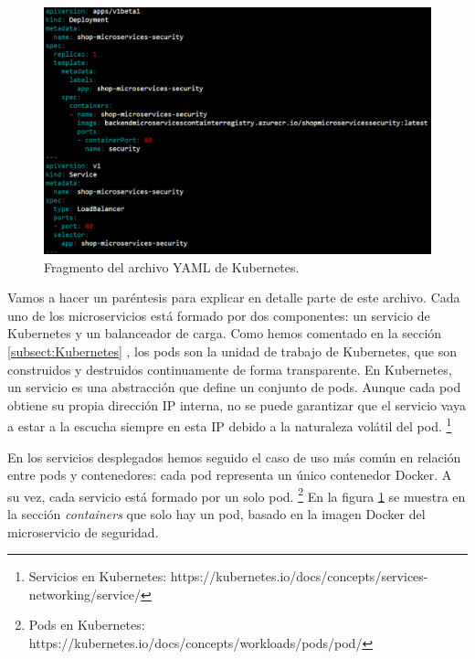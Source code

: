 \documentclass[11pt,spanish,listoffigures]{tfgetsinf}
\begin{document}
\begin{figure}[h]
\centering
\includegraphics[scale=0.6]{KubernetesSecurity}
\caption{Fragmento del archivo YAML de Kubernetes.}
\label{fig:KubernetesSecurity}
\end{figure}

Vamos a hacer un paréntesis para explicar en detalle parte de este archivo. Cada uno de los microservicios está formado por dos componentes: un servicio de Kubernetes y un balanceador de carga. Como hemos comentado en la sección \ref{subsect:Kubernetes} , los pods son la unidad de trabajo de Kubernetes, que son construidos y destruidos continuamente de forma transparente. En Kubernetes, un servicio es una abstracción que define un conjunto de pods. Aunque cada pod obtiene su propia dirección IP interna, no se puede garantizar que el servicio vaya a estar a la escucha siempre en esta IP debido a la naturaleza volátil del pod. \footnote{ Servicios en Kubernetes: https://kubernetes.io/docs/concepts/services-networking/service/} 

En los servicios desplegados hemos seguido el caso de uso más común en relación entre pods y contenedores: cada pod representa un único contenedor Docker. A su vez, cada servicio está formado por un solo pod. \footnote{ Pods en Kubernetes: https://kubernetes.io/docs/concepts/workloads/pods/pod/} En la figura \ref{fig:KubernetesSecurity} se muestra en la sección \textit{containers} que solo hay un pod, basado en la imagen Docker del microservicio de seguridad.
\end{document}
